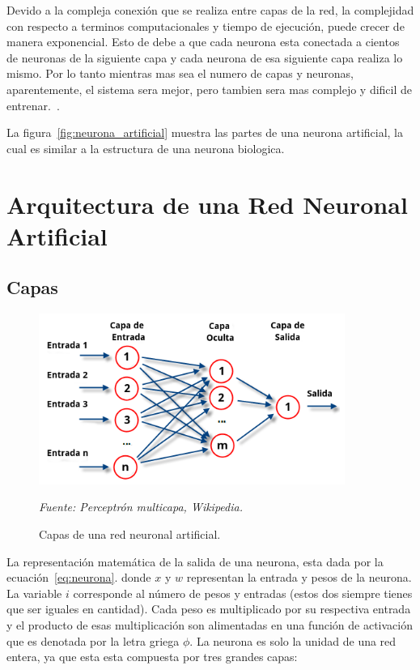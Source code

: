 Devido a la compleja conexión que se realiza entre capas de la red, la complejidad con respecto a terminos computacionales y tiempo de ejecución, puede crecer de manera exponencial. Esto de debe a que cada neurona esta conectada a cientos de neuronas de la siguiente capa y cada neurona de esa siguiente capa realiza lo mismo. Por lo tanto mientras mas sea el numero de capas y neuronas, aparentemente, el sistema sera mejor, pero tambien sera mas complejo y dificil de entrenar.~\cite{21RedesNeuronales}.

La figura~\ref{fig:neurona_artificial} muestra las partes de una neurona artificial, la cual es similar a la estructura de una neurona biologica.


\section{Arquitectura de una Red Neuronal Artificial}
\subsection{Capas}

\begin{figure}[H]
		\centering
		\includegraphics[width=100mm]{Imagenes/capas_red_neuronal.png}
		\caption{Capas de una red neuronal artificial.}
		\vspace{0.15cm}
		\textit{Fuente: Perceptrón multicapa, Wikipedia.}
		\label{fig:capa_red_neuronal}
\end{figure} 

La representación matemática de la salida de una neurona, esta dada por la ecuación~\ref{eq:neurona}. donde $x$ y $w$ representan la entrada y pesos de la neurona. La variable $i$ corresponde al número de pesos y entradas (estos dos siempre tienes que ser iguales en cantidad). Cada peso es multiplicado por su respectiva entrada y el producto de esas multiplicación son alimentadas en una función de activación que es denotada por la letra griega $\phi$. La neurona es solo la unidad de una red entera, ya que esta esta compuesta por tres grandes capas:

